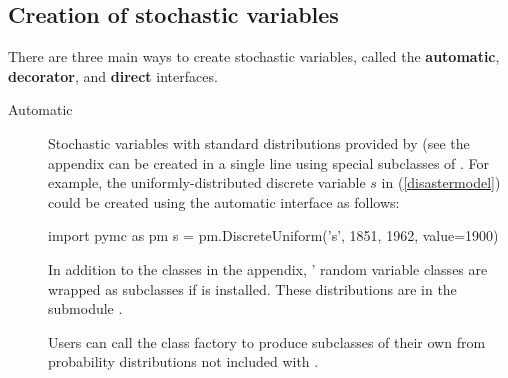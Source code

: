 \documentclass[]{jss}
\begin{document}
\subsection{Creation of stochastic variables}
There are three main ways to create stochastic variables, called the \textbf{automatic}, \textbf{decorator}, and \textbf{direct} interfaces.

\begin{description}
    \item[Automatic] Stochastic variables with standard distributions provided by  (see the appendix can be created in a single line using special subclasses of . For example, the uniformly-distributed discrete variable $s$ in (\ref{disastermodel}) could be created using the automatic interface as follows:
\begin{CodeInput}
import pymc as pm
s = pm.DiscreteUniform('s', 1851, 1962, value=1900)
\end{CodeInput}

    In addition to the classes in the appendix, ' random variable classes are wrapped as  subclasses if  is installed. These distributions are in the submodule .

    Users can call the class factory  to produce  subclasses of their own from probability distributions not included with .%



\end{description}
\end{document}
